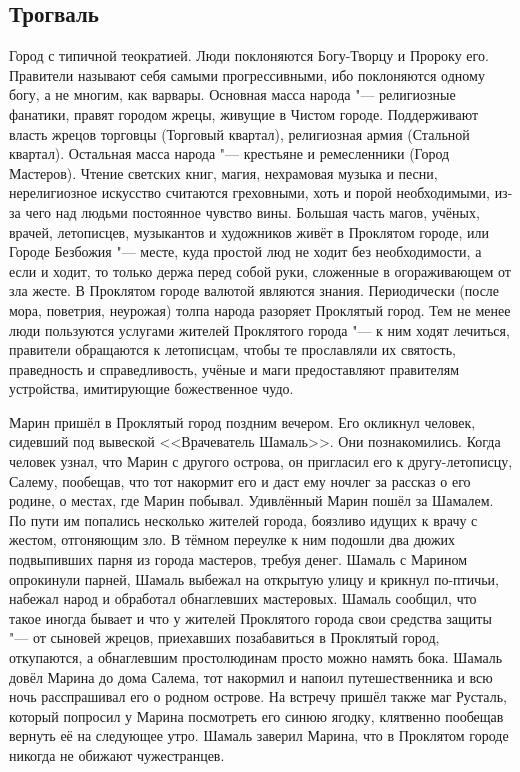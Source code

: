 \subsection{Трогваль}

Город с типичной теократией.
Люди поклоняются Богу-Творцу и Пророку его.
Правители называют себя самыми прогрессивными, ибо поклоняются одному богу, а не многим, как варвары.
Основная масса народа "--- религиозные фанатики, правят городом жрецы, живущие в Чистом городе.
Поддерживают власть жрецов торговцы (Торговый квартал), религиозная армия (Стальной квартал).
Остальная масса народа "--- крестьяне и ремесленники (Город Мастеров).
Чтение светских книг, магия, нехрамовая музыка и песни, нерелигиозное искусство считаются греховными, хоть и порой необходимыми, из-за чего над людьми постоянное чувство вины.
Большая часть магов, учёных, врачей, летописцев, музыкантов и художников живёт в Проклятом городе, или Городе Безбожия "--- месте, куда простой люд не ходит без необходимости, а если и ходит, то только держа перед собой руки, сложенные в огораживающем от зла жесте.
В Проклятом городе валютой являются знания.
Периодически (после мора, поветрия, неурожая) толпа народа разоряет Проклятый город.
Тем не менее люди пользуются услугами жителей Проклятого города "--- к ним ходят лечиться, правители обращаются к летописцам, чтобы те прославляли их святость, праведность и справедливость, учёные и маги предоставляют правителям устройства, имитирующие божественное чудо.

Марин пришёл в Проклятый город поздним вечером.
Его окликнул человек, сидевший под вывеской <<Врачеватель Шамаль>>.
Они познакомились.
Когда человек узнал, что Марин с другого острова, он пригласил его к другу-летописцу, Салему, пообещав, что тот накормит его и даст ему ночлег за рассказ о его родине, о местах, где Марин побывал.
Удивлённый Марин пошёл за Шамалем.
По пути им попались несколько жителей города, боязливо идущих к врачу с жестом, отгоняющим зло.
В тёмном переулке к ним подошли два дюжих подвыпивших парня из города мастеров, требуя денег.
Шамаль с Марином опрокинули парней, Шамаль выбежал на открытую улицу и крикнул по-птичьи, набежал народ и обработал обнаглевших мастеровых.
Шамаль сообщил, что такое иногда бывает и что у жителей Проклятого города свои средства защиты "--- от сыновей жрецов, приехавших позабавиться в Проклятый город, откупаются, а обнаглевшим простолюдинам просто можно намять бока.
Шамаль довёл Марина до дома Салема, тот накормил и напоил путешественника и всю ночь расспрашивал его о родном острове.
На встречу пришёл также маг Русталь, который попросил у Марина посмотреть его синюю ягодку, клятвенно пообещав вернуть её на следующее утро.
Шамаль заверил Марина, что в Проклятом городе никогда не обижают чужестранцев.

